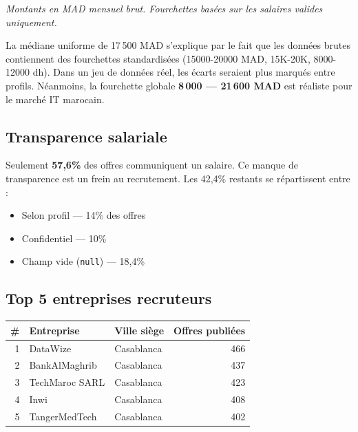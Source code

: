 \documentclass[12pt,a4paper]{article}
\begin{document}
{\small\textit{Montants en MAD mensuel brut. Fourchettes basées sur les salaires valides uniquement.}}

\begin{alertbox}
La médiane uniforme de 17\,500 MAD s'explique par le fait que les données brutes contiennent des fourchettes standardisées (\og{}15000-20000 MAD\fg{}, \og{}15K-20K\fg{}, \og{}8000-12000 dh\fg{}). Dans un jeu de données réel, les écarts seraient plus marqués entre profils. Néanmoins, la fourchette globale \textbf{8\,000 --- 21\,600 MAD} est réaliste pour le marché IT marocain.
\end{alertbox}

\subsection{Transparence salariale}

Seulement \textbf{57,6\%} des offres communiquent un salaire. Ce manque de transparence est un frein au recrutement. Les 42,4\% restants se répartissent entre :
\begin{itemize}[leftmargin=*]
    \item \og{}Selon profil\fg{} --- 14\% des offres
    \item \og{}Confidentiel\fg{} --- 10\%
    \item Champ vide (\texttt{null}) --- 18,4\%
\end{itemize}

\subsection{Top 5 entreprises recruteurs}

\begin{center}
\renewcommand{\arraystretch}{1.3}
\begin{tabularx}{\textwidth}{r l l r}
\toprule
\textbf{\#} & \textbf{Entreprise} & \textbf{Ville siège} & \textbf{Offres publiées} \\
\midrule
1 & DataWize & Casablanca & 466 \\
2 & BankAlMaghrib & Casablanca & 437 \\
3 & TechMaroc SARL & Casablanca & 423 \\
4 & Inwi & Casablanca & 408 \\
5 & TangerMedTech & Casablanca & 402 \\
\bottomrule
\end{tabularx}
\end{center}
\end{document}
